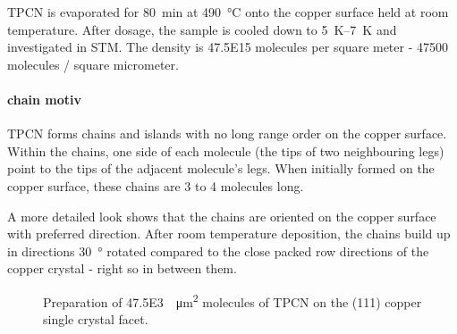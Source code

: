 TPCN is evaporated for \SI{80}{\minute} at \SI{490}{\degreeCelsius} onto the copper surface held at room temperature. After dosage, the sample is cooled down to \SIrange{5}{7}{\kelvin} and investigated in STM. The density  is \SI{47.5E15}{} molecules per square meter - 47500 molecules / square micrometer.

\paragraph{chain motiv}
TPCN forms chains and islands with no long range order on the copper surface. Within the chains, one side of each molecule (the tips of two neighbouring legs) point to the tips of the adjacent molecule's legs. When initially formed on the copper surface, these chains are 3 to 4 molecules long.

A more detailed look shows that the chains are oriented on the copper surface with preferred direction. After room temperature deposition, the chains build up in directions \SI{30}{\degree} rotated compared to the close packed row directions of the copper crystal - right so in between them.

\begin{figure}[!h]
 \caption{Preparation of \SI{47.5E3}{\per\square\micro\meter} molecules of TPCN on the (111) copper single crystal facet.}
\end{figure}

